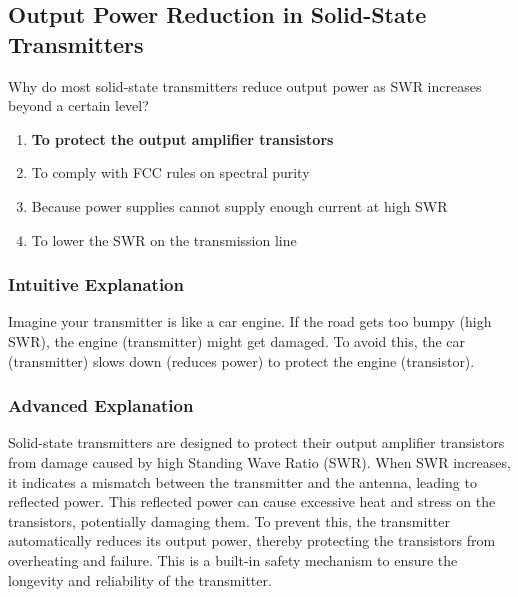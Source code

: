 \subsection{Output Power Reduction in Solid-State Transmitters}
\label{T7C05}

\begin{tcolorbox}[colback=gray!10!white,colframe=black!75!black,title=T7C05]
Why do most solid-state transmitters reduce output power as SWR increases beyond a certain level?
\begin{enumerate}[noitemsep]
    \item \textbf{To protect the output amplifier transistors}
    \item To comply with FCC rules on spectral purity
    \item Because power supplies cannot supply enough current at high SWR
    \item To lower the SWR on the transmission line
\end{enumerate}
\end{tcolorbox}

\subsubsection*{Intuitive Explanation}
Imagine your transmitter is like a car engine. If the road gets too bumpy (high SWR), the engine (transmitter) might get damaged. To avoid this, the car (transmitter) slows down (reduces power) to protect the engine (transistor).

\subsubsection*{Advanced Explanation}
Solid-state transmitters are designed to protect their output amplifier transistors from damage caused by high Standing Wave Ratio (SWR). When SWR increases, it indicates a mismatch between the transmitter and the antenna, leading to reflected power. This reflected power can cause excessive heat and stress on the transistors, potentially damaging them. To prevent this, the transmitter automatically reduces its output power, thereby protecting the transistors from overheating and failure. This is a built-in safety mechanism to ensure the longevity and reliability of the transmitter.